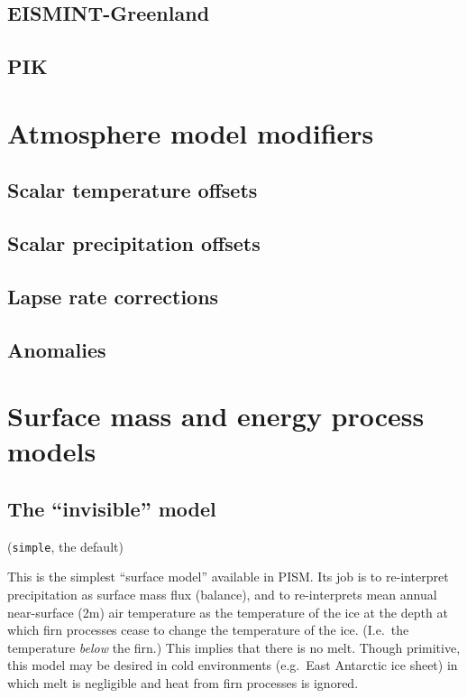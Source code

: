 \documentclass[titlepage,letterpaper,final]{scrartcl}
\def\optsection#1{%
  \def\optindex##1{\index[options]{#1!##1}}
  \def\optseealso##1{\index[options]{#1|see{##1}}}
}
\begin{document}
\subsection{EISMINT-Greenland}
\label{sec:eismint-greenland}

\subsection{PIK}
\label{sec:atmosphere-pik}


\section{Atmosphere model modifiers}
\label{sec:atmosphere-mods}

\subsection{Scalar temperature offsets}
\label{sec:delta-temp}

\subsection{Scalar precipitation offsets}
\label{sec:delta-precip}

\subsection{Lapse rate corrections}
\label{sec:lapse-rates}

\subsection{Anomalies}
\label{sec:anomalies}



\section{Surface mass and energy process models}
\label{sec:surface-snow}
\optsection{Climate (boundary) models!\texttt{-surface} [simple, constant, elevation, given, pdd, forcing]}

\subsection{The ``invisible'' model}
\label{sec:invisible-model}

(\texttt{simple}, the default)

This is the simplest ``surface model'' available in PISM. Its job is to
re-interpret precipitation as surface mass flux (balance), and to re-interprets
mean annual near-surface (2m) air temperature as the temperature of the ice at
the depth at which firn processes cease to change the temperature of the ice.
(I.e.~the temperature \emph{below} the firn.) This implies that there is no
melt. Though primitive, this model may be desired in cold environments
(e.g.~East Antarctic ice sheet) in which melt is negligible and heat from firn
processes is ignored.
\end{document}
